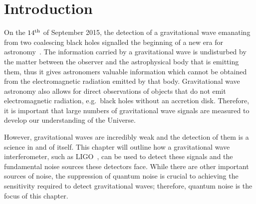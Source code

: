 \section{Introduction}
On the $14^{\rm{th}}$ of September 2015, the detection of a gravitational wave emanating from two coalescing black holes signalled the beginning of a new era for astronomy~\cite{Abbott2016}. The information carried by a gravitational wave is undisturbed by the matter between the observer and the astrophysical body that is emitting them, thus it gives astronomers valuable information which cannot be obtained from the electromagnetic radiation emitted by that body. Gravitational wave astronomy also allows for direct observations of objects that do not emit electromagnetic radiation, e.g.~black holes without an accretion disk. Therefore, it is important that large numbers of gravitational wave signals are measured to develop our understanding of the Universe.%
\par
However, gravitational waves are incredibly weak and the detection of them is a science in and of itself. This chapter will outline how a gravitational wave interferometer, such as LIGO~\cite{Aasi2015}, can be used to detect these signals and the fundamental noise sources these detectors face. While there are other important sources of noise, the suppression of quantum noise is crucial to achieving the sensitivity required to detect gravitational waves; therefore, quantum noise is the focus of this chapter.

